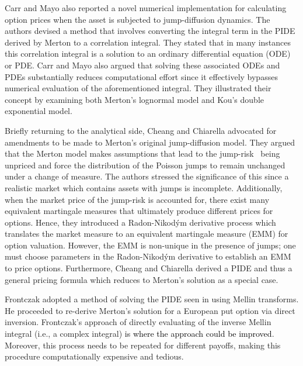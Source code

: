 Carr and Mayo \cite{Carr2007} also reported a novel numerical implementation for calculating option prices when the asset is subjected to jump-diffusion dynamics. The authors devised a method that involves converting the integral term in the PIDE derived by Merton \cite{Merton1976} to a correlation integral. They stated that in many instances this correlation integral is a solution to an ordinary differential equation (ODE) or PDE. Carr and Mayo also argued that solving these associated ODEs and PDEs substantially reduces computational effort since it effectively bypasses numerical evaluation of the aforementioned integral. They illustrated their concept by examining both Merton's lognormal model and Kou's double exponential model.

Briefly returning to the analytical side, Cheang and Chiarella \cite{Cheang2011} advocated for amendments to be made to Merton's original jump-diffusion model. They argued that the Merton model makes assumptions that lead to the jump-risk~\cite{Gibson2001} being unpriced and force the distribution of the Poisson jumps to remain unchanged under a change of measure. The authors stressed the significance of this since a realistic market which contains assets with jumps is incomplete. Additionally, when the market price of the jump-risk is accounted for, there exist many equivalent martingale measures that ultimately produce different prices for options. Hence, they introduced a Radon-Nikod\'{y}m derivative process which translates the market measure to an equivalent martingale measure (EMM) for option valuation. However, the EMM is non-unique in the presence of jumps; one must choose parameters in the Radon-Nikod\'{y}m derivative to establish an EMM to price options. Furthermore, Cheang and Chiarella derived a PIDE and thus a general pricing formula which reduces to Merton's solution \cite{Merton1976} as a special case.

Frontczak \cite{Frontczak2013} adopted a method of solving the PIDE seen in \cite{Merton1976} using Mellin transforms. He proceeded to re-derive Merton's solution for a European put option via direct inversion. Frontczak's approach of directly evaluating of the inverse Mellin integral (i.e., a complex integral) \textcolor{black}{is where the approach could be improved}. Moreover, this process needs to be repeated for different payoffs, making this procedure computationally expensive and tedious.
	
	
